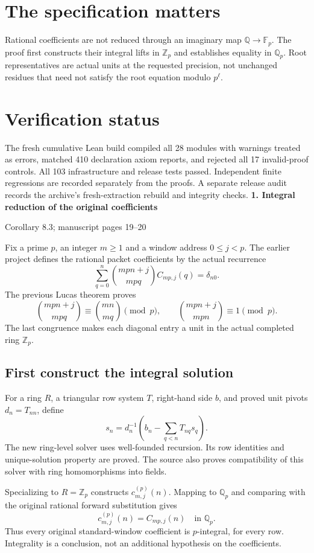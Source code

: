 \documentclass[11pt]{article}
\newcommand{\Q}{\mathbb Q}\newcommand{\Z}{\mathbb Z}\newcommand{\N}{\mathbb N}
\newcommand{\F}{\mathbb F}
\newcommand{\pageheading}[2]{{\Large\bfseries\color{ink}#1}\par{\small #2}\par\medskip}
\begin{document}
\section*{The specification matters}
Rational coefficients are not reduced through an imaginary map $\Q\to\F_p$. The proof first constructs their integral lifts in $\Z_p$ and establishes equality in $\Q_p$. Root representatives are actual units at the requested precision, not unchanged residues that need not satisfy the root equation modulo $p^\ell$.

\section*{Verification status}
The fresh cumulative Lean build compiled all 28 modules with warnings treated as errors, matched 410 declaration axiom reports, and rejected all 17 invalid-proof controls. All 103 infrastructure and release tests passed. Independent finite regressions are recorded separately from the proofs. A separate release audit records the archive's fresh-extraction rebuild and integrity checks.
\newpage
\pageheading{1. Integral reduction of the original coefficients}{Corollary 8.3; manuscript pages 19--20}
Fix a prime $p$, an integer $m\geq1$ and a window address $0\leq j<p$. The earlier project defines the rational packet coefficients by the actual recurrence
\[
 \sum_{q=0}^{n}\binom{mpn+j}{mpq}C_{mp,j}(q)=\delta_{n0}.
\]
The previous Lucas theorem proves
\[
 \binom{mpn+j}{mpq}\equiv\binom{mn}{mq}\pmod p,\qquad
 \binom{mpn+j}{mpn}\equiv1\pmod p.
\]
The last congruence makes each diagonal entry a unit in the actual completed ring $\Z_p$.

\subsection*{First construct the integral solution}
For a ring $R$, a triangular row system $T$, right-hand side $b$, and proved unit pivots $d_n=T_{nn}$, define
\[
 s_n=d_n^{-1}\left(b_n-\sum_{q<n}T_{nq}s_q\right).
\]
The new ring-level solver uses well-founded recursion. Its row identities and unique-solution property are proved. The source also proves compatibility of this solver with ring homomorphisms into fields.

Specializing to $R=\Z_p$ constructs $c^{(p)}_{m,j}(n)$. Mapping to $\Q_p$ and comparing with the original rational forward substitution gives
\[
 \boxed{c^{(p)}_{m,j}(n)=C_{mp,j}(n)\quad\text{in }\Q_p.}
\]
Thus every original standard-window coefficient is $p$-integral, for every row. Integrality is a conclusion, not an additional hypothesis on the coefficients.
\end{document}
